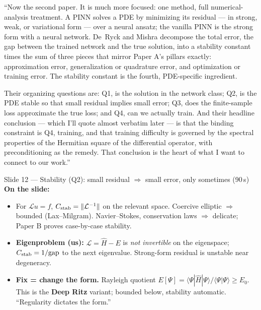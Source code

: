 \documentclass[11pt]{article}
\begin{document}
\begin{say}
``Now the second paper. It is much more focused: one method, full numerical-analysis treatment. A
PINN solves a PDE by minimizing its residual --- in strong, weak, or variational form --- over a
neural ansatz; the vanilla PINN is the strong form with a neural network. De~Ryck and Mishra
decompose the total error, the gap between the trained network and the true solution, into a stability
constant times the sum of three pieces that mirror Paper A's pillars exactly: approximation error,
generalization or quadrature error, and optimization or training error. The stability constant is the
fourth, PDE-specific ingredient.

Their organizing questions are: Q1, is the solution in the network class; Q2, is the PDE stable so
that small residual implies small error; Q3, does the finite-sample loss approximate the true loss;
and Q4, can we actually train. And their headline conclusion --- which I'll quote almost verbatim
later --- is that the binding constraint is Q4, training, and that training difficulty is governed by
the spectral properties of the Hermitian square of the differential operator, with preconditioning as
the remedy. That conclusion is the heart of what I want to connect to our work.''
\end{say}

\begin{slide}{Slide 12 --- Stability (Q2): small residual $\Rightarrow$ small error, only sometimes (90\,s)}
\textbf{On the slide:}
\begin{itemize}[leftmargin=*]
\item For $\mathcal L u=f$, $C_{\rm stab}=\|\mathcal L^{-1}\|$ on the relevant space. Coercive elliptic
$\Rightarrow$ bounded (Lax--Milgram). Navier--Stokes, conservation laws $\Rightarrow$ delicate; Paper
B proves case-by-case stability.
\item \textbf{Eigenproblem (us):} $\mathcal L=\hat H-E$ is \emph{not invertible} on the eigenspace;
$C_{\rm stab}=1/\text{gap}$ to the next eigenvalue. Strong-form residual is unstable near
degeneracy.
\item \textbf{Fix = change the form.} Rayleigh quotient $E[\Psi]=\langle\Psi|\hat H|\Psi\rangle/
\langle\Psi|\Psi\rangle\ge E_0$. This is the \textbf{Deep Ritz} variant; bounded below, stability
automatic. ``Regularity dictates the form.''
\end{itemize}
\end{slide}
\end{document}
